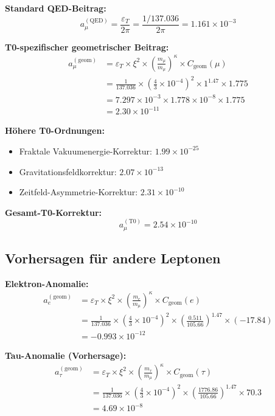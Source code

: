 \documentclass[12pt,a4paper]{article}
\begin{document}
\textbf{Standard QED-Beitrag:}
\begin{equation}
	a_\mu^{(\text{QED})} = \frac{\varepsilon_T}{2\pi} = \frac{1/137.036}{2\pi} = 1.161 \times 10^{-3}
\end{equation}

\textbf{T0-spezifischer geometrischer Beitrag:}
\begin{align}
	a_\mu^{(\text{geom})} &= \varepsilon_T \times \xi^2 \times \left(\frac{m_\mu}{m_\mu}\right)^\kappa \times C_{\text{geom}}(\mu)\\
	&= \frac{1}{137.036} \times \left(\frac{4}{3} \times 10^{-4}\right)^2 \times 1^{1.47} \times 1.775\\
	&= 7.297 \times 10^{-3} \times 1.778 \times 10^{-8} \times 1.775\\
	&= 2.30 \times 10^{-11}
\end{align}

\textbf{Höhere T0-Ordnungen:}
\begin{itemize}
	\item Fraktale Vakuumenergie-Korrektur: $1.99 \times 10^{-25}$
	\item Gravitationsfeldkorrektur: $2.07 \times 10^{-13}$
	\item Zeitfeld-Asymmetrie-Korrektur: $2.31 \times 10^{-10}$
\end{itemize}

\textbf{Gesamt-T0-Korrektur:}
\begin{equation}
	\boxed{a_\mu^{(\text{T0})} = 2.54 \times 10^{-10}}
\end{equation}

\subsection{Vorhersagen für andere Leptonen}

\textbf{Elektron-Anomalie:}
\begin{align}
	a_e^{(\text{geom})} &= \varepsilon_T \times \xi^2 \times \left(\frac{m_e}{m_\mu}\right)^\kappa \times C_{\text{geom}}(e)\\
	&= \frac{1}{137.036} \times \left(\frac{4}{3} \times 10^{-4}\right)^2 \times \left(\frac{0.511}{105.66}\right)^{1.47} \times (-17.84)\\
	&= -0.993 \times 10^{-12}
\end{align}

\textbf{Tau-Anomalie (Vorhersage):}
\begin{align}
	a_\tau^{(\text{geom})} &= \varepsilon_T \times \xi^2 \times \left(\frac{m_\tau}{m_\mu}\right)^\kappa \times C_{\text{geom}}(\tau)\\
	&= \frac{1}{137.036} \times \left(\frac{4}{3} \times 10^{-4}\right)^2 \times \left(\frac{1776.86}{105.66}\right)^{1.47} \times 70.3\\
	&= 4.69 \times 10^{-8}
\end{align}
\end{document}
